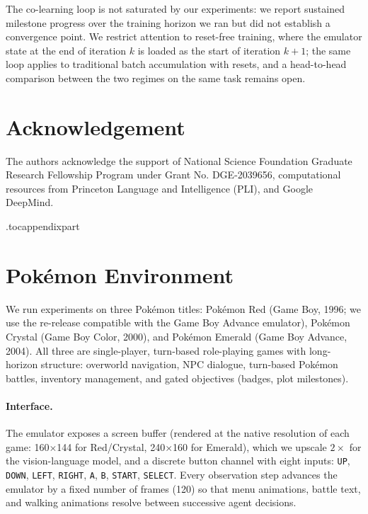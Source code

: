 \documentclass[11pt]{article}
\begin{document}
The co-learning loop is not saturated by our experiments: we report sustained milestone progress over the training horizon we ran but did not establish a convergence point. We restrict attention to reset-free training, where the emulator state at the end of iteration $k$ is loaded as the start of iteration $k{+}1$; the same loop applies to traditional batch accumulation with resets, and a head-to-head comparison between the two regimes on the same task remains open.


\section*{Acknowledgement}
The authors acknowledge the support of National Science Foundation Graduate Research Fellowship Program under Grant No. DGE-2039656, computational resources from Princeton Language and Intelligence (PLI), and Google DeepMind.










\clearpage
\appendix
\etocdepthtag.toc{appendixpart}

\renewcommand{\contentsname}{Appendix Contents}
\tableofcontents
\vspace{1em}
\newpage


\section{Pok\'emon Environment}\label{app:environment}

We run experiments on three Pok\'emon titles: Pok\'emon Red (Game Boy, 1996; we use the re-release compatible with the Game Boy Advance emulator), Pok\'emon Crystal (Game Boy Color, 2000), and Pok\'emon Emerald (Game Boy Advance, 2004). All three are single-player, turn-based role-playing games with long-horizon structure: overworld navigation, NPC dialogue, turn-based Pok\'emon battles, inventory management, and gated objectives (badges, plot milestones).

\paragraph{Interface.} The emulator exposes a screen buffer (rendered at the native resolution of each game: 160$\times$144 for Red/Crystal, 240$\times$160 for Emerald), which we upscale $2\times$ for the vision-language model, and a discrete button channel with eight inputs: \texttt{UP}, \texttt{DOWN}, \texttt{LEFT}, \texttt{RIGHT}, \texttt{A}, \texttt{B}, \texttt{START}, \texttt{SELECT}. Every observation step advances the emulator by a fixed number of frames (120) so that menu animations, battle text, and walking animations resolve between successive agent decisions.
\end{document}
